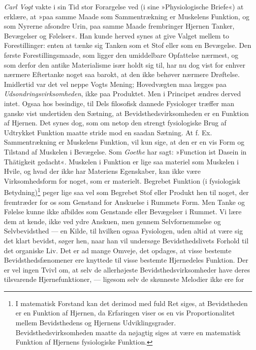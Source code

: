 \documentclass[12pt,a4paper,openany]{book}
\newcommand{\opage}[1]{\marginnote{\footnotesize\textit{[#1]}}}
\begin{document}
\emph{Carl Vogt} vakte i sin Tid stor Forargelse ved (i sine
»Physiologische Briefe«) at erklære, at »paa samme Maade som
Sammentrækning er Muskelens Funktion, og som Nyrerne afsondre Urin, paa
samme Maade frembringer Hjernen Tanker, Bevægelser og Følelser«. Han
kunde herved synes at give Valget mellem to Forestillinger: enten at
tænke sig Tanken
\opage{72}som et Stof eller som en Bevægelse. Den første
Forestillingsmaade, som ligger den umiddelbare Opfattelse nærmest, og
som derfor den antike Materialisme især holdt sig til, har nu dog vist
for enhver nærmere Eftertanke noget saa barokt, at den ikke behøver
nærmere Drøftelse. Imidlertid var det vel neppe Vogts Mening;
Hovedvægten maa lægges paa \emph{Udsondringsvirksomheden}, ikke paa
Produktet. Men i Principet ændres derved intet. Ogsaa hos besindige, til
Dels filosofisk dannede Fysiologer træffer man ganske vist undertiden
den Sætning, at Bevidsthedsvirksomheden er en Funktion af Hjernen. Det
synes dog, som om netop den strengt fysiologiske Brug af Udtrykket
Funktion maatte stride mod en saadan Sætning. At f. Ex. Sammentrækning
er Muskelens Funktion, vil kun sige, at den er en vis Form og Tilstand
af Muskelen i Bevægelse. Som \emph{Goethe} har sagt: »Function ist
Dasein in Thätigkeit gedacht«. Muskelen i Funktion er lige saa materiel
som Muskelen i Hvile, og hvad der ikke har Materiens Egenskaber, kan
ikke være Virksomhedsform for noget, som er materielt. Begrebet Funktion
(i fysiologisk Betydning)\footnote[1]{I matematisk Forstand kan det
derimod med fuld Ret siges, at Bevidstheden er en Funktion af Hjernen,
da Erfaringen viser os en vis Proportionalitet mellem Bevidsthedens og
Hjernens Udviklingsgrader. Bevidsthedsvirksomheden maatte da nøjagtig
siges at være en matematisk Funktion af Hjernens fysiologiske Funktion.}
peger lige saa vel som Begrebet Stof eller Produkt hen til noget, der
fremtræder for os som Genstand for Anskuelse i Rummets Form. Men Tanke
og Følelse kunne ikke afbildes som Genstande eller Bevægelser i Rummet.
Vi lære dem at kende, ikke ved ydre Anskuen, men gennem Selvfornemmelse
og Selvbevidsthed --- en Kilde, til hvilken ogsaa Fysiologen, uden altid
at være sig det klart bevidst, søger hen, naar han vil undersøge
Bevidsthedslivets Forhold til det organiske Liv. Det er ad mange Omveje,
det opdages, at visse bestemte Bevidsthedsfænomener ere knyttede til
visse bestemte Hjernedeles Funktion. Der er vel ingen Tvivl om, at selv
de allerhøjeste Bevidsthedsvirksomheder have deres tilsvarende
Hjernefunktioner, --- ligesom selv de skønneste Melodier ikke ere for
\end{document}
